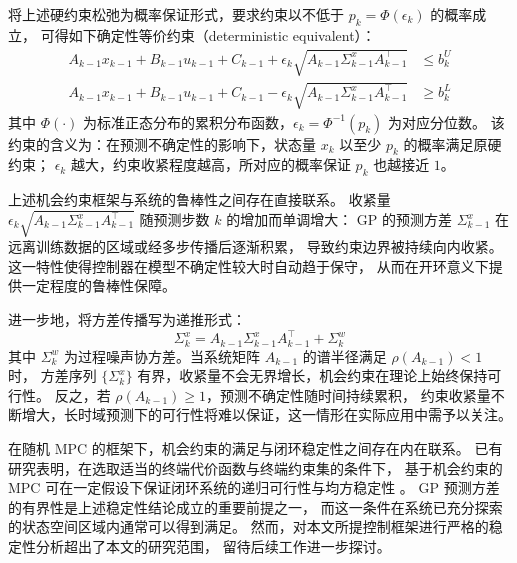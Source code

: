 将上述硬约束松弛为概率保证形式，要求约束以不低于 $p_k = \Phi(\epsilon_k)$ 的概率成立，
可得如下确定性等价约束（deterministic equivalent）：
\begin{equation}
    \begin{aligned}
        A_{k-1} x_{k-1} + B_{k-1} u_{k-1} + C_{k-1} 
        + \epsilon_k \sqrt{A_{k-1} \Sigma_{k-1}^x A_{k-1}^\top} 
        &\leq b_k^U \\
        A_{k-1} x_{k-1} + B_{k-1} u_{k-1} + C_{k-1} 
        - \epsilon_k \sqrt{A_{k-1} \Sigma_{k-1}^x A_{k-1}^\top} 
        &\geq b_k^L
    \end{aligned}
\end{equation}
其中 $\Phi(\cdot)$ 为标准正态分布的累积分布函数，$\epsilon_k = \Phi^{-1}(p_k)$ 为对应分位数。
该约束的含义为：在预测不确定性的影响下，状态量 $x_k$ 以至少 $p_k$ 的概率满足原硬约束；
$\epsilon_k$ 越大，约束收紧程度越高，所对应的概率保证 $p_k$ 也越接近 $1$。

上述机会约束框架与系统的鲁棒性之间存在直接联系。
收紧量 $\epsilon_k \sqrt{A_{k-1} \Sigma_{k-1}^x A_{k-1}^\top}$ 随预测步数 $k$ 的增加而单调增大：
GP 的预测方差 $\Sigma_{k-1}^x$ 在远离训练数据的区域或经多步传播后逐渐积累，
导致约束边界被持续向内收紧。这一特性使得控制器在模型不确定性较大时自动趋于保守，
从而在开环意义下提供一定程度的鲁棒性保障。

进一步地，将方差传播写为递推形式：
\begin{equation}
    \Sigma_k^x = A_{k-1} \Sigma_{k-1}^x A_{k-1}^\top + \Sigma_k^w
\end{equation}
其中 $\Sigma_k^w$ 为过程噪声协方差。当系统矩阵 $A_{k-1}$ 的谱半径满足 $\rho(A_{k-1}) < 1$ 时，
方差序列 $\{\Sigma_k^x\}$ 有界，收紧量不会无界增长，机会约束在理论上始终保持可行性。
反之，若 $\rho(A_{k-1}) \geq 1$，预测不确定性随时间持续累积，
约束收紧量不断增大，长时域预测下的可行性将难以保证，这一情形在实际应用中需予以关注。

在随机 MPC 的框架下，机会约束的满足与闭环稳定性之间存在内在联系。
已有研究表明，在选取适当的终端代价函数与终端约束集的条件下，
基于机会约束的 MPC 可在一定假设下保证闭环系统的递归可行性与均方稳定性
\cite{survey_lb_mpc, Mesbah_2016}。
GP 预测方差的有界性是上述稳定性结论成立的重要前提之一，
而这一条件在系统已充分探索的状态空间区域内通常可以得到满足。
然而，对本文所提控制框架进行严格的稳定性分析超出了本文的研究范围，
留待后续工作进一步探讨。

